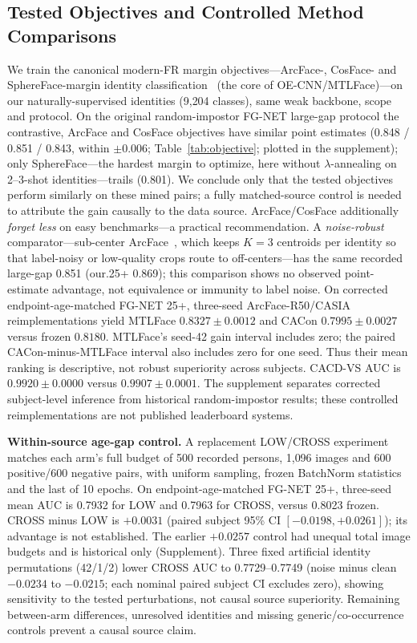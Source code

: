\documentclass[journal]{IEEEtran}
\begin{document}
\subsection{Tested Objectives and Controlled Method Comparisons}\label{sec:res-objective}
We train the canonical modern-FR margin objectives---ArcFace-, CosFace- and SphereFace-margin identity classification~\cite{deng2019arcface} (the core of OE-CNN/MTLFace)---on our naturally-supervised identities (9{,}204 classes), same weak backbone, scope and protocol. On the original random-impostor FG-NET large-gap protocol the contrastive, ArcFace and CosFace objectives have similar point estimates (0.848 / 0.851 / 0.843, within $\pm$0.006; Table~\ref{tab:objective}; plotted in the supplement); only SphereFace---the hardest margin to optimize, here without $\lambda$-annealing on 2--3-shot identities---trails (0.801). We conclude only that the tested objectives perform similarly on these mined pairs; a fully matched-source control is needed to attribute the gain causally to the data source. ArcFace/CosFace additionally \emph{forget less} on easy benchmarks---a practical recommendation. A \emph{noise-robust} comparator---sub-center ArcFace~\cite{deng2020subcenter}, which keeps $K{=}3$ centroids per identity so that label-noisy or low-quality crops route to off-centers---has the same recorded large-gap 0.851 (our.25+ 0.869); this comparison shows no observed point-estimate advantage, not equivalence or immunity to label noise. On corrected endpoint-age-matched FG-NET 25+, three-seed ArcFace-R50/CASIA reimplementations yield MTLFace $0.8327\pm0.0012$ and CACon $0.7995\pm0.0027$ versus frozen $0.8180$. MTLFace's seed-42 gain interval includes zero; the paired CACon-minus-MTLFace interval also includes zero for one seed. Thus their mean ranking is descriptive, not robust superiority across subjects. CACD-VS AUC is $0.9920\pm0.0000$ versus $0.9907\pm0.0001$. The supplement separates corrected subject-level inference from historical random-impostor results; these controlled reimplementations are not published leaderboard systems.

\noindent\textbf{Within-source age-gap control.} A replacement LOW/CROSS experiment matches each arm's full budget of 500 recorded persons, 1{,}096 images and 600 positive/600 negative pairs, with uniform sampling, frozen BatchNorm statistics and the last of 10 epochs. On endpoint-age-matched FG-NET 25+, three-seed mean AUC is 0.7932 for LOW and 0.7963 for CROSS, versus 0.8023 frozen. CROSS minus LOW is $+0.0031$ (paired subject 95\% CI $[-0.0198,+0.0261]$); its advantage is not established. The earlier $+0.0257$ control had unequal total image budgets and is historical only (Supplement). Three fixed artificial identity permutations (42/1/2) lower CROSS AUC to 0.7729--0.7749 (noise minus clean $-0.0234$ to $-0.0215$; each nominal paired subject CI excludes zero), showing sensitivity to the tested perturbations, not causal source superiority. Remaining between-arm differences, unresolved identities and missing generic/co-occurrence controls prevent a causal source claim.
\end{document}
